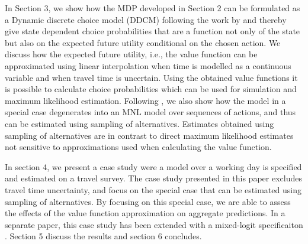In Section 3, we show how the MDP developed in Section 2 can be formulated as a Dynamic discrete choice model (DDCM) following the work by \citet{rust1987} and thereby give state dependent choice probabilities that are a function not only of the state but also on the expected future utility conditional on the chosen action. We discuss how the expected future utility, i.e., the value function can be approximated using linear interpolation when time is modelled as a continuous variable and when travel time is uncertain. Using the obtained value functions it is possible to calculate choice probabilities which can be used for simulation and maximum likelihood estimation. Following \citet{fosgerau2013}, we also show how the model in a special case degenerates into an MNL model over sequences of actions, and thus can be estimated using sampling of alternatives. Estimates obtained using sampling of alternatives are in contrast to direct maximum likelihood estimates not sensitive to approximations used when calculating the value function.



In section 4, we present a case study were a model over a working day is specified and estimated on a travel survey. The case study presented in this paper excludes travel time uncertainty, and focus on the special case that can be estimated using sampling of alternatives. By focusing on this special case, we are able to assess the effects of the value function approximation on aggregate predictions. In a separate paper, this case study has been extended with a mixed-logit specificaiton \citep{maelleMixed17}. Section 5 discuss the results and section 6 concludes.


